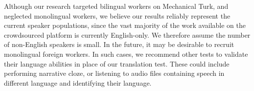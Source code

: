 \documentclass[11pt]{article}
\begin{document}
Although our research targeted bilingual workers on Mechanical Turk, and neglected monolingual workers, we believe our results reliably represent the current speaker populations, since the vast majority of the work available on the crowdsourced platform is currently English-only.  We therefore assume the number of non-English speakers is small.  In the future, it may be desirable to recruit monolingual foreign workers.  In such cases, we recommend other tests to validate their language abilities in place of our translation test.  These could include performing narrative cloze, or listening to audio files containing speech in different language and identifying their language. 




\end{document}
